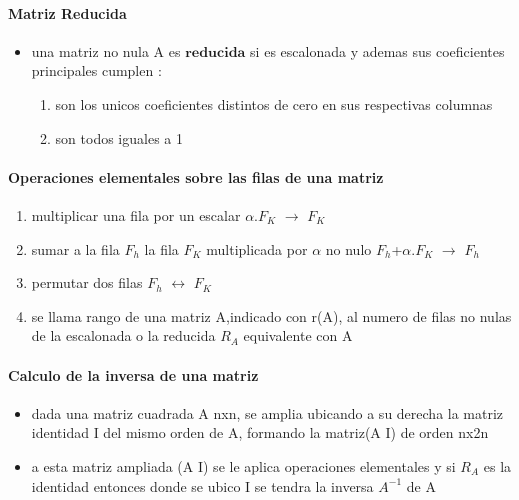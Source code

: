 \documentclass[a4paper]{article}
\begin{document}
\paragraph{Matriz Reducida}

\begin{itemize}
	\item una matriz no nula A es $\textbf{reducida}$ si es escalonada y ademas sus coeficientes principales cumplen :
	\begin{enumerate}
		\item son los unicos coeficientes distintos de cero en sus respectivas columnas
		\item son todos iguales a 1
	\end{enumerate}
\end{itemize}

\paragraph{Operaciones elementales sobre las filas de una matriz}
\begin{enumerate}
	\item multiplicar una fila por un escalar $\alpha.F_K$ $\longrightarrow$ $F_K$
	\item sumar a la fila $F_h$ la fila $F_K$ multiplicada por $\alpha$ no nulo
	 $F_h$+$\alpha$.$F_K$ $\longrightarrow$ $F_h$ 
	\item permutar dos filas $F_h$ $\longleftrightarrow$ $F_K$
	\item se llama rango de una matriz A,indicado con r(A), al numero de filas no nulas de la escalonada o la reducida $R_A$ equivalente con A
\end{enumerate}

\paragraph{Calculo de la inversa de una matriz}
\begin{itemize}
	\item dada una matriz cuadrada A nxn, se amplia ubicando a su derecha la matriz identidad I del mismo orden de A, formando la matriz(A I) de orden nx2n
	\item a esta matriz ampliada (A I) se le aplica operaciones elementales y si $R_A$ es la identidad entonces donde se ubico I se tendra la inversa $A^{-1}$ de A
\end{itemize}
\end{document}
